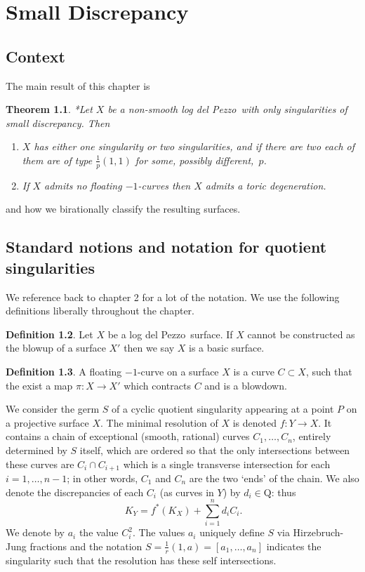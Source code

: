 \documentclass[12pt,a4paper]{book}      %
\newtheorem{thm}{Theorem}[section]
\theoremstyle{definition}
\newtheorem{dfn}[thm]{Definition}
\newcommand{\ldp}{log del Pezzo}
\newcommand{\Q}{\mathrm{Q}}
\begin{document}
\chapter{Small Discrepancy}

\section{Context}
The main result of this chapter is 
\begin{thm}*\label{ThmOnSing}
Let $X$ be a non-smooth \ldp\ with only singularities of small discrepancy. Then 
\begin{enumerate}
\item\label{thm38i}
$X$ has either one singularity or two singularities, and if there are two each of them are of type $\frac{1}p(1,1)$ for some, possibly different,~$p$.
\item\label{thm38ii}
If $X$ admits no floating $-1$-curves then $X$ admits a toric degeneration. %
\end{enumerate}
\end{thm}
and how we birationally classify the resulting surfaces.

\section{Standard notions and notation for quotient singularities}
We reference back to chapter 2 for a lot of the notation. We use the following definitions liberally throughout the chapter.
\begin{dfn}
Let $X$ be a \ldp\ surface. If $X$ cannot be constructed as the blowup of a surface $X'$ then we say $X$ is a basic surface.

\end{dfn}

\begin{dfn}
A floating $-1$-curve on a surface $X$ is a curve $C \subset X$, such that the exist a map $\pi \colon X \rightarrow X'$ which contracts $C$ and is a blowdown.
\end{dfn}

We consider the germ $S$ of a cyclic quotient singularity appearing at a point $P$ on a 
projective surface $X$.
The minimal resolution of $X$ is denoted $f\colon Y \longrightarrow X$. It contains a chain of
exceptional (smooth, rational)
curves $C_1,\dots,C_n$, entirely determined by $S$ itself, which are ordered so
that the only intersections between these curves are
$C_i\cap C_{i+1}$ which is a single transverse intersection for each $i=1,\dots,n-1$; 
in other words,
$C_1$ and $C_n$ are the two `ends' of the chain.
We also denote the discrepancies of each $C_i$ (as curves in $Y$) by $d_i\in\Q$: thus
\[\
K_Y = f^*(K_X) + \sum_{i=1}^n d_i C_i.
\]
We denote by $a_i$ the value $C_i^2$. The values $a_i$ uniquely define $S$ via Hirzebruch-Jung fractions \cite{Reid-cyclic} and the notation $S=\frac{1}{r}(1, a) = [a_1, \dots , a_n]$ indicates the singularity such that the resolution has these self intersections.
\label{sec!notation}
\end{document}
